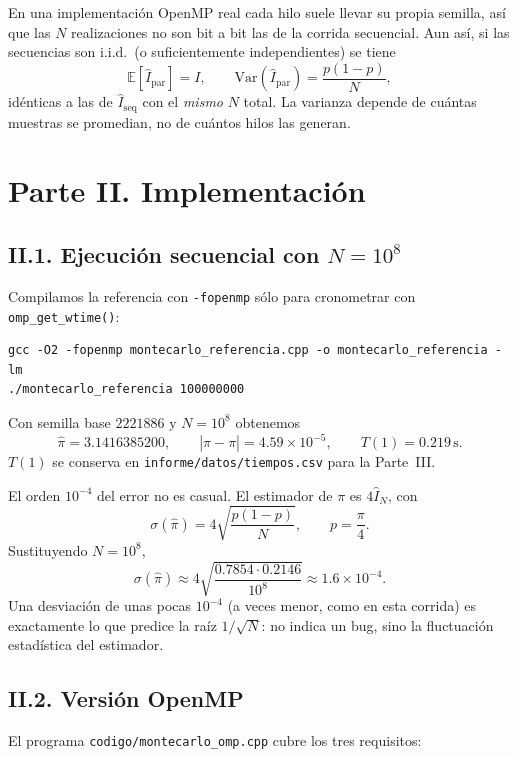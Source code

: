 \documentclass[12pt,a4paper]{article}
\begin{document}
En una implementaci\'on OpenMP real cada hilo suele llevar su propia semilla, as\'i que las $N$ realizaciones no son bit a bit las de la corrida secuencial. Aun as\'i, si las secuencias son i.i.d.\ (o suficientemente independientes) se tiene
\[
\mathbb{E}[\hat I_{\mathrm{par}}] = I,
\qquad
\mathrm{Var}(\hat I_{\mathrm{par}}) = \frac{p(1-p)}{N},
\]
id\'enticas a las de $\hat I_{\mathrm{seq}}$ con el \emph{mismo} $N$ total. La varianza depende de cu\'antas muestras se promedian, no de cu\'antos hilos las generan.

\section*{Parte II. Implementaci\'on}

\subsection*{II.1. Ejecuci\'on secuencial con $N=10^8$}

Compilamos la referencia con \texttt{-fopenmp} s\'olo para cronometrar con \texttt{omp\_get\_wtime()}:
\begin{verbatim}
gcc -O2 -fopenmp montecarlo_referencia.cpp -o montecarlo_referencia -lm
./montecarlo_referencia 100000000
\end{verbatim}
Con semilla base $2221886$ y $N=10^8$ obtenemos
\[
\hat\pi = 3.1416385200,
\qquad
|\hat\pi-\pi| = 4.59\times 10^{-5},
\qquad
T(1)=0.219\,\mathrm{s}.
\]
$T(1)$ se conserva en \texttt{informe/datos/tiempos.csv} para la Parte~III.

El orden $10^{-4}$ del error no es casual. El estimador de $\pi$ es $4\hat I_N$, con
\[
\sigma(\hat\pi)
= 4\sqrt{\frac{p(1-p)}{N}},
\qquad p=\frac{\pi}{4}.
\]
Sustituyendo $N=10^8$,
\[
\sigma(\hat\pi)
\approx 4\sqrt{\frac{0.7854\cdot 0.2146}{10^8}}
\approx 1.6\times 10^{-4}.
\]
Una desviaci\'on de unas pocas $10^{-4}$ (a veces menor, como en esta corrida) es exactamente lo que predice la ra\'iz $1/\sqrt{N}$: no indica un bug, sino la fluctuaci\'on estad\'istica del estimador.

\subsection*{II.2. Versi\'on OpenMP}

El programa \texttt{codigo/montecarlo\_omp.cpp} cubre los tres requisitos:
\end{document}
